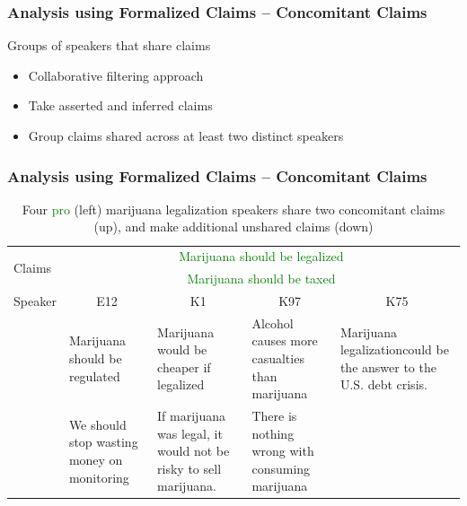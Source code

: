 \documentclass{beamer}
\newcommand{\pro}[1]{\textcolor{green}{#1}}
\newcommand{\con}[1]{\textcolor{red}{#1}}
\begin{document}
\begin{frame}
	\frametitle{Analysis using Formalized Claims -- Concomitant Claims}
	Groups of speakers that share claims
	\begin{itemize}
		\item Collaborative filtering approach \cite{he2017neural}
		\item Take asserted and inferred claims
		\item Group claims shared across at least two distinct speakers
	\end{itemize}
\end{frame}

\begin{frame}
	\frametitle{Analysis using Formalized Claims -- Concomitant Claims}
\begin{table}[t]
	\scriptsize{
		\begin{tabular}{p{1cm} | p{1.3cm} p{1.5cm} p{1.5cm} p{1.5cm} |  }
	\toprule
			\multirow{2}{*}{\parbox{1cm}{Claims}} &

	\multicolumn{4}{c|}{\pro{Marijuana should be legalized}}
	\\[1ex]

	& 
	\multicolumn{4}{c|}{\pro{Marijuana should be taxed}} 
	\\[2ex]

	Speaker & 
	\multicolumn{1}{c}{\small{E12}} &
	\multicolumn{1}{c}{\small{K1}}  &
	\multicolumn{1}{c}{\small{K97}} &
	\multicolumn{1}{c|}{\small{K75}}

	\\[1ex]

	\hline

	& 
	Marijuana should be regulated & 
	Marijuana would be cheaper if legalized & 
	Alcohol causes more casualties than marijuana & 
	Marijuana legalizationcould be the answer to the U.S. debt crisis.

	\\
	\hline

	& 
	We should stop wasting money on monitoring & 
	If marijuana was legal, it would not be risky to sell marijuana. &
	There is nothing wrong with consuming marijuana & 
	

	\\
	\bottomrule
\end{tabular}
}
	\caption{Four \pro{pro} (left)  
	marijuana legalization speakers share two concomitant claims (up),
	and make additional unshared claims (down)
	}
\end{table}

\end{frame}
\end{document}
